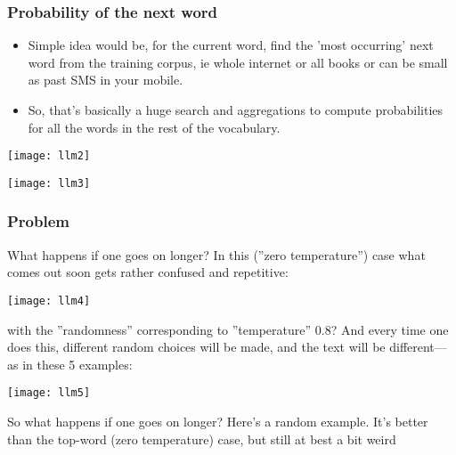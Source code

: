 \begin{frame}[fragile]\frametitle{Probability of the next word}

\begin{itemize}
\item Simple idea would be, for the current word, find the 'most occurring' next word from the training corpus, ie whole internet or all books or can be small as past SMS in your mobile.
\item So, that's basically a huge search and aggregations to compute probabilities for all the words in the rest of the vocabulary.
\end{itemize}	

\begin{center}
\texttt{[image: llm2]}

\texttt{[image: llm3]}
\end{center}


\end{frame}

\begin{frame}[fragile]\frametitle{Problem}

What happens if one goes on longer? In this (''zero temperature'') case what comes out soon gets rather confused and repetitive:

\begin{center}
\texttt{[image: llm4]}
\end{center}

with the ''randomness'' corresponding to ''temperature'' 0.8? And every time one does this, different random choices will be made, and the text will be different—as in these 5 examples:

\begin{center}
\texttt{[image: llm5]}
\end{center}

So what happens if one goes on longer? Here’s a random example. It’s better than the top-word (zero temperature) case, but still at best a bit weird

\end{frame}


